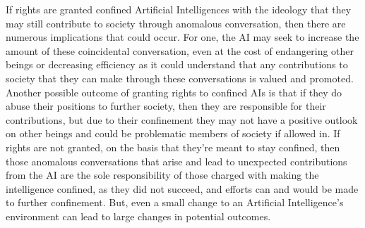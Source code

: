 If rights are granted confined Artificial Intelligences with the ideology that they may still contribute to society through anomalous conversation, then there are numerous implications that could occur. For one, the AI may seek to increase the amount of these coincidental conversation, even at the cost of endangering other beings or decreasing efficiency as it could understand that any contributions to society that they can make through these conversations is valued and promoted. Another possible outcome of granting rights to confined AIs is that if they do abuse their positions to further society, then they are responsible for their contributions, but due to their confinement they may not have a positive outlook on other beings and could be problematic members of society if allowed in. If rights are not granted, on the basis that they're meant to stay confined, then those anomalous conversations that arise and lead to unexpected contributions from the AI are the sole responsibility of those charged with making the intelligence confined, as they did not succeed, and efforts can and would be made to further confinement. But, even a small change to an Artificial Intelligence's environment can lead to large changes in potential outcomes.
